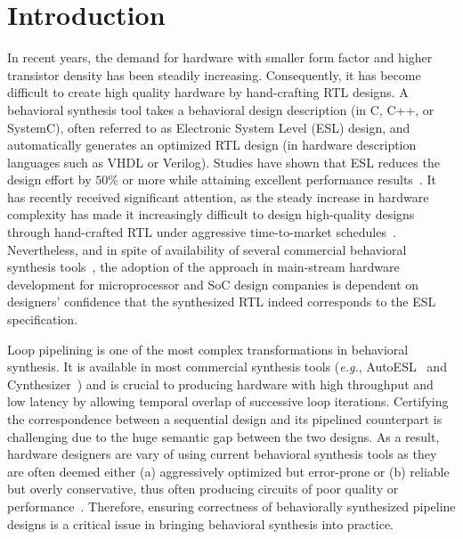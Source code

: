 \section{Introduction}
\label{sec:intro}

In recent years, the demand for hardware with smaller form factor and higher transistor density has been steadily increasing. Consequently, it has become difficult to create high quality hardware by hand-crafting RTL designs. A behavioral synthesis tool takes a behavioral
design description (in C, C++, or SystemC), often referred to as Electronic System Level (ESL) design, and automatically generates an optimized RTL design (in hardware description languages such as VHDL or Verilog). 
Studies have shown that ESL 
reduces the design effort by $50\%$ or more while attaining
excellent performance results~\cite{Moussa99}. 
It has recently received significant attention, as the steady 
increase in hardware complexity has made it increasingly 
difficult to design high-quality designs through hand-crafted RTL under 
aggressive time-to-market schedules~\cite{googledecoder}. Nevertheless, and in spite of availability of several
commercial behavioral synthesis tools~\cite{ctos,forte,vivado},
the adoption of the approach in main-stream hardware development for
microprocessor and SoC design companies is dependent on 
designers' confidence that the synthesized RTL indeed corresponds to the ESL
specification. 

Loop pipelining is one of the most complex transformations in behavioral synthesis. It is available in most commercial synthesis tools ({\em e.g.}, AutoESL~\cite{autoesl} and Cynthesizer~\cite{forte}) and is
crucial to producing hardware with high throughput and low latency by allowing temporal overlap of successive loop
iterations. Certifying the correspondence between a sequential design and its pipelined counterpart is challenging due to the huge semantic gap between the two
designs. As a result, hardware designers are vary of using current behavioral synthesis tools as
they are often deemed either (a) aggressively optimized but error-prone or (b) 
reliable but overly conservative, thus often producing circuits of poor quality
or performance~\cite{spark,kundu2008}. Therefore, ensuring
correctness of behaviorally synthesized pipeline designs
is a critical issue in bringing behavioral synthesis into practice.

